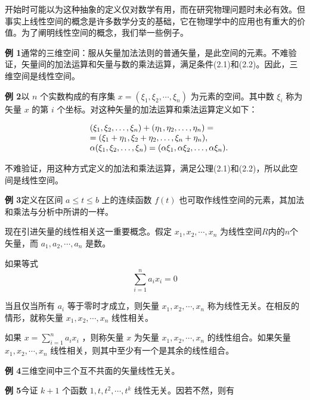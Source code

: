 开始时可能以为这种抽象的定义仅对数学有用，而在研究物理问题时未必有效。但事实上线性空间的概念是许多数学分支的基础，它在物理学中的应用也有重大的价值。为了阐明线性空间的概念，我们举一些例子。

\textbf{例 1}\quad 通常的三维空间：服从矢量加法法则的普通矢量，是此空间的元素。不难验证，矢量间的加法运算和矢量与数的乘法运算，满足条件(2.1)和(2.2)。因此，三维空间是线性空间。

\textbf{例 2}\quad 以 $n$ 个实数构成的有序集 $x = (\xi_{1}, \xi_{2}, \cdots, \xi_{n})$ 为元素的空间。其中数 $\xi_{i}$ 称为矢量 $x$ 的第 $i$ 个坐标。对这种矢量的加法运算和乘法运算定义如下：

\begin{equation*}
\begin{array}{r l} & (\xi_ {1}, \xi_ {2}, \dots , \xi_ {n}) + (\eta_ {1}, \eta_ {2}, \dots , \eta_ {n}) = \\ & = (\xi_ {1} + \eta_ {1}, \xi_ {2} + \eta_ {2}, \dots , \xi_ {n} + \eta_ {n}), \\ & \alpha (\xi_ {1}, \xi_ {2}, \dots , \xi_ {n}) = (\alpha \xi_ {1}, \alpha \xi_ {2}, \dots , \alpha \xi_ {n}). \end{array}
\end{equation*}

不难验证，用这种方式定义的加法和乘法运算，满足公理(2.1)和(2.2)，所以此空间是线性空间。

\textbf{例 3}\quad 定义在区间 $a \leqslant t \leqslant b$ 上的连续函数 $f(t)$ 也可取作线性空间的元素，其加法和乘法与分析中所讲的一样。

现在引进矢量的线性相关这一重要概念。假定 $x_{1}, x_{2}, \cdots, x_{n}$ 为线性空间$R$内的$n$个矢量，而 $a_{1}, a_{2}, \cdots, a_{n}$ 是数。

如果等式
\begin{equation*}
\sum_ {i = 1} ^ {n} a _ {i} x _ {i} = 0\tag{2.3}
\end{equation*}

当且仅当所有 $a_{i}$ 等于零时才成立，则矢量 $x_{1}, x_{2}, \cdots, x_{n}$ 称为线性无关。在相反的情形，就称矢量 $x_{1}, x_{2}, \cdots, x_{n}$ 线性相关。

如果 $x = \sum_{i=1}^{n} a_{i} x_{i}$ ，则称矢量 $x$ 为矢量 $x_{1}, x_{2}, \cdots, x_{n}$ 的线性组合。如果矢量 $x_{1}, x_{2}, \cdots, x_{n}$ 线性相关，则其中至少有一个是其余的线性组合。

\textbf{例 4}\quad 三维空间中三个互不共面的矢量线性无关。

\textbf{例 5}\quad 今证 $k+1$ 个函数 $1, t, t^{2}, \cdots, t^{k}$ 线性无关。因若不然，则有

